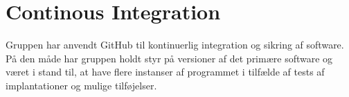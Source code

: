 \section{Continous Integration}\label{sec:contintegration}
Gruppen har anvendt GitHub til kontinuerlig integration og sikring af software. På den måde har gruppen 
holdt styr på versioner af det primære software og været i stand til, at have flere instanser af programmet i tilfælde af tests af implantationer og mulige tilføjelser.  